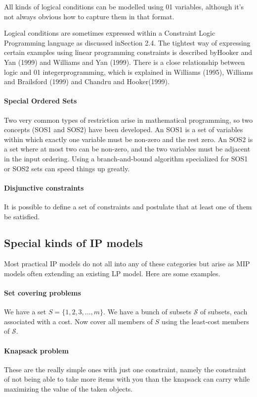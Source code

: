\documentclass[12pt, landscape]{article}
\begin{document}
All kinds of logical conditions can be modelled using 01 variables, although it's not always obvious how to capture them in that format. 

Logical conditions are sometimes expressed within a Constraint Logic Programming language as discussed inSection 2.4. The tightest way of expressing certain examples using linear programming constraints is described byHooker and Yan (1999) and Williams and Yan (1999). There is a close relationship between logic and 01 integerprogramming, which is explained in Williams (1995), Williams and Brailsford (1999) and Chandru and Hooker(1999).

\paragraph*{Special Ordered Sets}
Two very common types of restriction arise in mathematical programming, so two concepts (SOS1 and SOS2) have been developed. An SOS1 is a set of variables within which exactly one variable must be non-zero and the rest zero. An SOS2 is a set where at most two can be non-zero, and the two variables must be adjacent in the input ordering. Using a branch-and-bound algorithm specialized for SOS1 or SOS2 sets can speed things up greatly.

\paragraph*{Disjunctive constraints}
It is possible to define a set of constraints and postulate that at least one of them be satisfied.

\subsection{Special kinds of IP models}
Most practical IP models do not all into any of these categories but arise as MIP models often extending an existing LP model. Here are some examples.

\paragraph*{Set covering problems} We have a set $S = \{1,2,3,\dots,m\}$. We have a bunch of subsets $\mathcal{S}$ of subsets, each associated with a cost. Now cover all members of $S$ using the least-cost members of $\mathcal{S}$.

\paragraph*{Knapsack problem} These are the really simple ones with just one constraint, namely the constraint of not being able to take more items with you than the knapsack can carry while maximizing the value of the taken objects.
\end{document}
